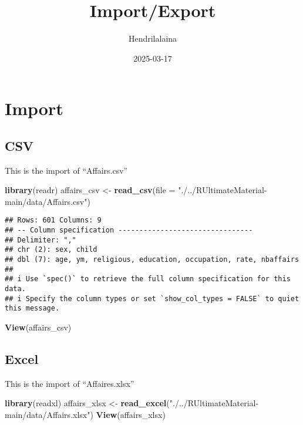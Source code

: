 \documentclass[
]{article}
\title{Import/Export}
\author{Hendrilalaina}
\date{2025-03-17}
\newenvironment{Shaded}{\begin{snugshade}}{\end{snugshade}}
\newcommand{\AttributeTok}[1]{\textcolor[rgb]{0.13,0.29,0.53}{#1}}
\newcommand{\FunctionTok}[1]{\textcolor[rgb]{0.13,0.29,0.53}{\textbf{#1}}}
\newcommand{\NormalTok}[1]{#1}
\newcommand{\OtherTok}[1]{\textcolor[rgb]{0.56,0.35,0.01}{#1}}
\newcommand{\StringTok}[1]{\textcolor[rgb]{0.31,0.60,0.02}{#1}}
\begin{document}
\maketitle

\section{Import}\label{import}

\subsection{CSV}\label{csv}

This is the import of ``Affairs.csv''

\begin{Shaded}
\begin{Highlighting}[]
\FunctionTok{library}\NormalTok{(readr)}
\NormalTok{affairs\_csv }\OtherTok{\textless{}{-}} \FunctionTok{read\_csv}\NormalTok{(}\AttributeTok{file =} \StringTok{"./../RUltimateMaterial{-}main/data/Affairs.csv"}\NormalTok{)}
\end{Highlighting}
\end{Shaded}

\begin{verbatim}
## Rows: 601 Columns: 9
## -- Column specification --------------------------------
## Delimiter: ","
## chr (2): sex, child
## dbl (7): age, ym, religious, education, occupation, rate, nbaffairs
## 
## i Use `spec()` to retrieve the full column specification for this data.
## i Specify the column types or set `show_col_types = FALSE` to quiet this message.
\end{verbatim}

\begin{Shaded}
\begin{Highlighting}[]
\FunctionTok{View}\NormalTok{(affairs\_csv)}
\end{Highlighting}
\end{Shaded}

\subsection{Excel}\label{excel}

This is the import of ``Affaires.xlsx''

\begin{Shaded}
\begin{Highlighting}[]
\FunctionTok{library}\NormalTok{(readxl)}
\NormalTok{affairs\_xlsx }\OtherTok{\textless{}{-}} \FunctionTok{read\_excel}\NormalTok{(}\StringTok{"./../RUltimateMaterial{-}main/data/Affairs.xlsx"}\NormalTok{)}
\FunctionTok{View}\NormalTok{(affairs\_xlsx)}
\end{Highlighting}
\end{Shaded}
\end{document}
